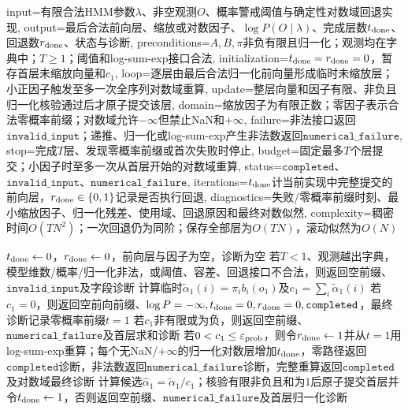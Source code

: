 \begin{AlgorithmContract}{
  input={有限合法HMM参数$\lambda$、非空观测$O$、概率警戒阈值与确定性对数域回退实现},
  output={最后合法前向层、缩放或对数因子、$\log P(O\mid\lambda)$、完成层数$t_{\rm done}$、回退数$r_{\rm done}$、状态与诊断},
  preconditions={$A,B,\pi$非负有限且归一化；观测均在字典中；$T\ge1$；阈值和log-sum-exp接口合法},
  initialization={$t_{\rm done}=r_{\rm done}=0$，暂存首层未缩放向量和$c_1$},
  loop={逐层由最后合法归一化前向量形成临时未缩放层；小正因子触发至多一次全序列对数域重算},
  update={整层向量和因子有限、非负且归一化核验通过后才原子提交该层},
  domain={缩放因子为有限正数；零因子表示合法零概率前缀；对数域允许$-\infty$但禁止NaN和$+\infty$},
  failure={非法接口返回$\mathtt{invalid\_input}$；递推、归一化或log-sum-exp产生非法数返回$\mathtt{numerical\_failure}$},
  stop={完成$T$层、发现零概率前缀或首次失败时停止},
  budget={固定最多$T$个层提交；小因子时至多一次从首层开始的对数域重算},
  status={$\mathtt{completed}$、$\mathtt{invalid\_input}$、$\mathtt{numerical\_failure}$},
  iterations={$t_{\rm done}$计当前实现中完整提交的前向层，$r_{\rm done}\in\{0,1\}$记录是否执行回退},
  diagnostics={失败/零概率前缀时刻、最小缩放因子、归一化残差、使用域、回退原因和最终对数似然},
  complexity={稠密时间$O(TN^2)$；一次回退仍为同阶；保存全部层为$O(TN)$，滚动似然为$O(N)$}
}
\begin{algorithm}[H]
\caption{缩放前向算法}\label{alg:V3-C05-forward-scaled}
$t_{\rm done}\leftarrow0$，$r_{\rm done}\leftarrow0$，前向层与因子为空，诊断为空\;
若$T<1$、观测越出字典，模型维数/概率/归一化非法，或阈值、容差、回退接口不合法，则返回空前缀、$\mathtt{invalid\_input}$及字段诊断\;
计算临时$\widetilde\alpha_1(i)=\pi_i b_i(o_1)$及$c_1=\sum_i\widetilde\alpha_1(i)$\;
若$c_1=0$，则返回空前向前缀、$\log P=-\infty,t_{\rm done}=0,r_{\rm done}=0,\mathtt{completed}$，最终诊断记录零概率前缀$t=1$\;
若$c_1$非有限或为负，则返回空前缀、$\mathtt{numerical\_failure}$及首层求和诊断\;
若$0<c_1\le\varepsilon_{\rm prob}$，则令$r_{\rm done}\leftarrow1$并从$t=1$用log-sum-exp重算；每个无NaN/$+\infty$的归一化对数层增加$t_{\rm done}$，零路径返回$\mathtt{completed}$诊断，非法数返回$\mathtt{numerical\_failure}$诊断，完整重算返回$\mathtt{completed}$及对数域最终诊断\;
计算候选$\widehat\alpha_1=\widetilde\alpha_1/c_1$；核验有限非负且和为$1$后原子提交首层并令$t_{\rm done}\leftarrow1$，否则返回空前缀、$\mathtt{numerical\_failure}$及首层归一化诊断\;

\end{algorithm}
\end{AlgorithmContract}
